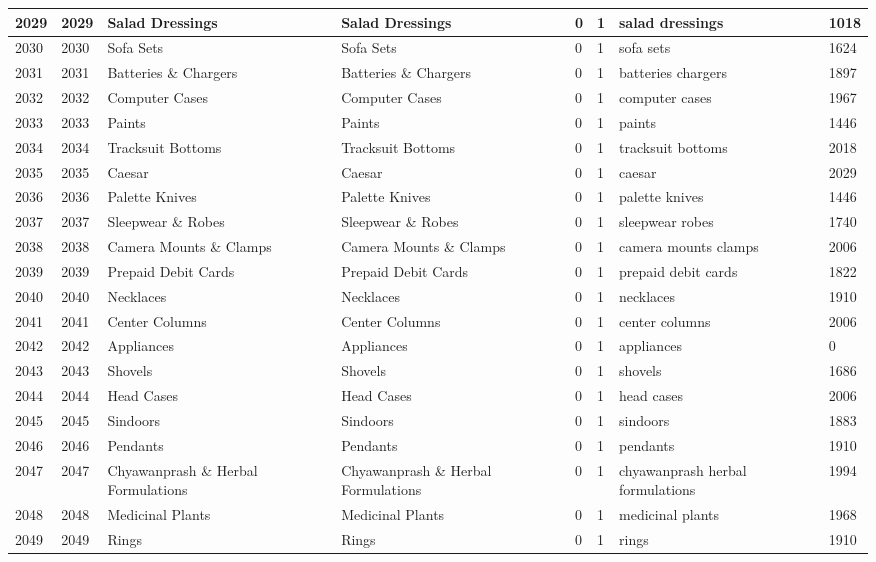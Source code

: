 \begin{longtable}{|l|l|l|l|l|l|l|l|}
2029 & 2029 & Salad Dressings & Salad Dressings & 0 & 1 & salad dressings & 1018 \\ \hline 
2030 & 2030 & Sofa Sets & Sofa Sets & 0 & 1 & sofa sets & 1624 \\ \hline 
2031 & 2031 & Batteries \& Chargers & Batteries \& Chargers & 0 & 1 & batteries chargers & 1897 \\ \hline 
2032 & 2032 & Computer Cases & Computer Cases & 0 & 1 & computer cases & 1967 \\ \hline 
2033 & 2033 & Paints & Paints & 0 & 1 & paints & 1446 \\ \hline 
2034 & 2034 & Tracksuit Bottoms & Tracksuit Bottoms & 0 & 1 & tracksuit bottoms & 2018 \\ \hline 
2035 & 2035 & Caesar & Caesar & 0 & 1 & caesar & 2029 \\ \hline 
2036 & 2036 & Palette Knives & Palette Knives & 0 & 1 & palette knives & 1446 \\ \hline 
2037 & 2037 & Sleepwear \& Robes & Sleepwear \& Robes & 0 & 1 & sleepwear robes & 1740 \\ \hline 
2038 & 2038 & Camera Mounts \& Clamps & Camera Mounts \& Clamps & 0 & 1 & camera mounts clamps & 2006 \\ \hline 
2039 & 2039 & Prepaid Debit Cards & Prepaid Debit Cards & 0 & 1 & prepaid debit cards & 1822 \\ \hline 
2040 & 2040 & Necklaces & Necklaces & 0 & 1 & necklaces & 1910 \\ \hline 
2041 & 2041 & Center Columns & Center Columns & 0 & 1 & center columns & 2006 \\ \hline 
2042 & 2042 & Appliances & Appliances & 0 & 1 & appliances & 0 \\ \hline 
2043 & 2043 & Shovels & Shovels & 0 & 1 & shovels & 1686 \\ \hline 
2044 & 2044 & Head Cases & Head Cases & 0 & 1 & head cases & 2006 \\ \hline 
2045 & 2045 & Sindoors & Sindoors & 0 & 1 & sindoors & 1883 \\ \hline 
2046 & 2046 & Pendants & Pendants & 0 & 1 & pendants & 1910 \\ \hline 
2047 & 2047 & Chyawanprash \& Herbal Formulations & Chyawanprash \& Herbal Formulations & 0 & 1 & chyawanprash herbal formulations & 1994 \\ \hline 
2048 & 2048 & Medicinal Plants & Medicinal Plants & 0 & 1 & medicinal plants & 1968 \\ \hline 
2049 & 2049 & Rings & Rings & 0 & 1 & rings & 1910 \\ \hline 

\end{longtable}
